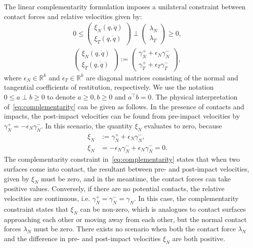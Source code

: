 {The linear complementarity formulation imposes a unilateral constraint between
contact forces and relative velocities given by:
\begin{equation}
  \begin{gathered}
    0 \leq 
    \begin{pmatrix}
      \xi_N(q, \dot{q}) \\
      \xi_T(q, \dot{q})
    \end{pmatrix} 
    \perp
      \begin{pmatrix}
        \lambda_N  \\
        \lambda_T
      \end{pmatrix} \geq 0, \\
    \begin{pmatrix}
      \xi_N(q, \dot{q}) \\
      \xi_T(q, \dot{q})
    \end{pmatrix} :=
      \begin{pmatrix}
        \gamma_N^+ + \epsilon_N \gamma_N^-  \\
        \gamma_T^+ + \epsilon_T \gamma_T^-
      \end{pmatrix},
  \end{gathered}
  \label{eq:complementarity} 
\end{equation}
\noindent where $\epsilon_N \in \mathbb{R}^k$ and $\epsilon_T \in \mathbb{R}^k$
are diagonal matrices consisting of the normal and tangential coefficients of
restitution, respectively. We use the notation $0 \leq a \perp b \geq 0$ to
denote $a \geq 0, b \geq 0$ and $a^\top b=0$.
% 
The physical interpretation of~\eqref{eq:complementarity} can be given as
follows.
%
%
In the presence of contacts and impacts, the post-impact velocities can be found
from pre-impact velocities by $\gamma_N^+ = -\epsilon_N \gamma_N^-$.
%
In this scenario, the quantity $\xi_N$ evaluates to zero, because
\begin{align*}
  \xi_N &:= \gamma_N^+ + \epsilon_N \gamma_N^-, \\
  \xi_N &= -\epsilon_N \gamma_N^- + \epsilon_N \gamma_N^- = 0.
\end{align*}
%
The complementarity constraint in~\eqref{eq:complementarity} states that when
two surfaces come into contact, the resultant between pre- and post-impact
velocities, given by $\xi_N$ must be zero, and in the meantime, the contact
forces can take positive values.
%
Conversely, if there are no potential contacts, the relative velocities are
continuous, i.e. $\gamma_N^+ = \gamma_N^- = \gamma_N$.
%
In this case, the complementarity constraint states that $\xi_N$ can be
non-zero, which is analogues to contact surfaces approaching each other or
moving away from each other, but the normal contact forces $\lambda_N$ must be
zero. 
%
There exists no scenario when both the contact force $\lambda_N$ and the
difference in pre- and post-impact velocities $\xi_N$ are both positive.
%

}
